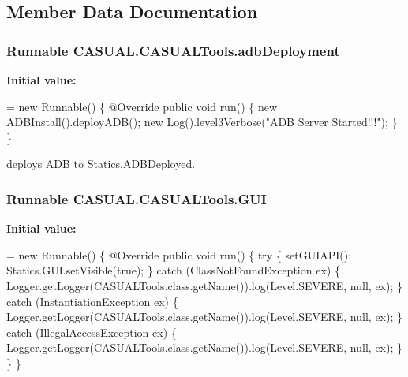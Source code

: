 \subsection{Member Data Documentation}
\hypertarget{classCASUAL_1_1CASUALTools_a5b0a4f18de75d5d15f59a073d9688d95}{
\subsubsection[{adb\-Deployment}]{\setlength{\rightskip}{0pt plus 5cm}Runnable C\-A\-S\-U\-A\-L.\-C\-A\-S\-U\-A\-L\-Tools.\-adb\-Deployment}}\label{classCASUAL_1_1CASUALTools_a5b0a4f18de75d5d15f59a073d9688d95}
{\bfseries Initial value\-:}
\begin{DoxyCode}
= \textcolor{keyword}{new} Runnable() \{
        @Override
        \textcolor{keyword}{public} \textcolor{keywordtype}{void} run() \{
            \textcolor{keyword}{new} ADBInstall().deployADB();
            \textcolor{keyword}{new} Log().level3Verbose(\textcolor{stringliteral}{"ADB Server Started!!!"});
        \}
    \}
\end{DoxyCode}
deploys A\-D\-B to Statics.\-A\-D\-B\-Deployed. \hypertarget{classCASUAL_1_1CASUALTools_a06e15c1a4ff6aaf8b3b81ff74afb5e2d}{
\subsubsection[{G\-U\-I}]{\setlength{\rightskip}{0pt plus 5cm}Runnable C\-A\-S\-U\-A\-L.\-C\-A\-S\-U\-A\-L\-Tools.\-G\-U\-I}}\label{classCASUAL_1_1CASUALTools_a06e15c1a4ff6aaf8b3b81ff74afb5e2d}
{\bfseries Initial value\-:}
\begin{DoxyCode}
= \textcolor{keyword}{new} Runnable() \{
        @Override
        \textcolor{keyword}{public} \textcolor{keywordtype}{void} run() \{
            \textcolor{keywordflow}{try} \{
                setGUIAPI();
                Statics.GUI.setVisible(\textcolor{keyword}{true});
            \} \textcolor{keywordflow}{catch} (ClassNotFoundException ex) \{
                Logger.getLogger(CASUALTools.class.getName()).log(Level.SEVERE, null, ex);
            \} \textcolor{keywordflow}{catch} (InstantiationException ex) \{
                Logger.getLogger(CASUALTools.class.getName()).log(Level.SEVERE, null, ex);
            \} \textcolor{keywordflow}{catch} (IllegalAccessException ex) \{
                Logger.getLogger(CASUALTools.class.getName()).log(Level.SEVERE, null, ex);
            \}
        \}
    \}
\end{DoxyCode}
